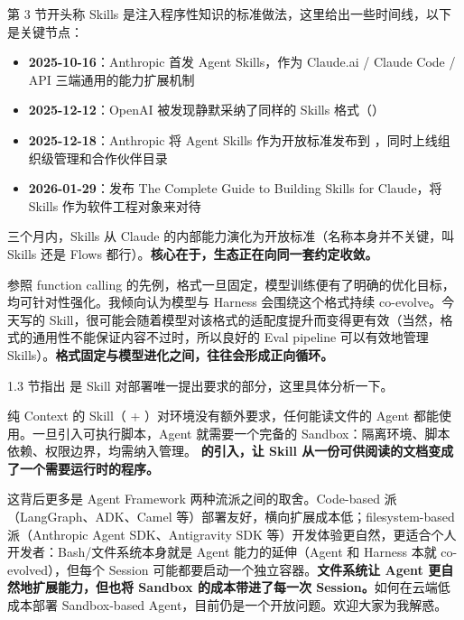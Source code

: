
第 3 节开头称 Skills 是注入程序性知识的标准做法，这里给出一些时间线，以下是关键节点：

\begin{itemize}
  \item \textbf{2025-10-16}：Anthropic 首发 Agent Skills，作为 Claude.ai / Claude Code / API 三端通用的能力扩展机制
  \item \textbf{2025-12-12}：OpenAI 被发现静默采纳了同样的 Skills 格式（）
  \item \textbf{2025-12-18}：Anthropic 将 Agent Skills 作为开放标准发布到 ，同时上线组织级管理和合作伙伴目录
  \item \textbf{2026-01-29}：发布 The Complete Guide to Building Skills for Claude，将 Skills 作为软件工程对象来对待
\end{itemize}

三个月内，Skills 从 Claude 的内部能力演化为开放标准（名称本身并不关键，叫 Skills 还是 Flows 都行）。\textbf{核心在于，生态正在向同一套约定收敛。}

参照 function calling 的先例，格式一旦固定，模型训练便有了明确的优化目标，均可针对性强化。我倾向认为模型与 Harness 会围绕这个格式持续 co-evolve。今天写的 Skill，很可能会随着模型对该格式的适配度提升而变得更有效（当然，格式的通用性不能保证内容不过时，所以良好的 Eval pipeline 可以有效地管理 Skills）。\textbf{格式固定与模型进化之间，往往会形成正向循环。}


1.3 节指出  是 Skill 对部署唯一提出要求的部分，这里具体分析一下。

纯 Context 的 Skill（ + ）对环境没有额外要求，任何能读文件的 Agent 都能使用。一旦引入可执行脚本，Agent 就需要一个完备的 Sandbox：隔离环境、脚本依赖、权限边界，均需纳入管理。\textbf{ 的引入，让 Skill 从一份可供阅读的文档变成了一个需要运行时的程序。}

这背后更多是 Agent Framework 两种流派之间的取舍。Code-based 派（LangGraph、ADK、Camel 等）部署友好，横向扩展成本低；filesystem-based 派（Anthropic Agent SDK、Antigravity SDK 等）开发体验更自然，更适合个人开发者：Bash/文件系统本身就是 Agent 能力的延伸（Agent 和 Harness 本就 co-evolved），但每个 Session 可能都要启动一个独立容器。\textbf{文件系统让 Agent 更自然地扩展能力，但也将 Sandbox 的成本带进了每一次 Session。}如何在云端低成本部署 Sandbox-based Agent，目前仍是一个开放问题。欢迎大家为我解惑。

